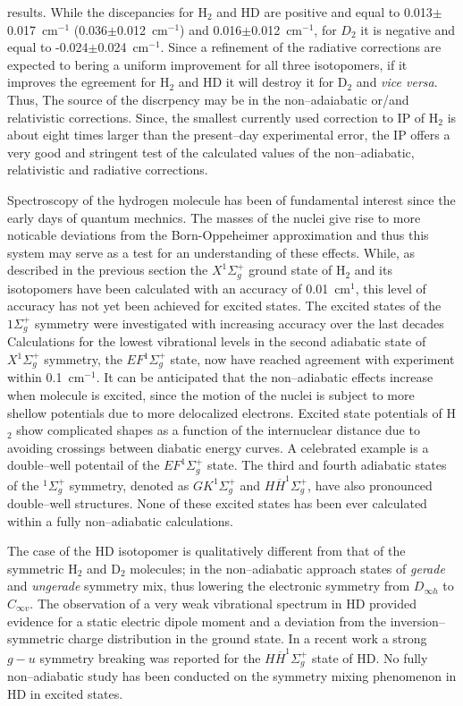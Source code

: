results. While the discepancies for H$_2$ and HD are positive
and equal to 0.013$\pm$0.017~cm$^{-1}$ (0.036$\pm$0.012~cm$^{-1}$)
and 0.016$\pm$0.012~cm$^{-1}$, for $D_2$ it is negative
and equal to -0.024$\pm$0.024~cm$^{-1}$.
Since  a refinement of the radiative corrections are expected
to bering a uniform improvement for all three isotopomers, if
it improves the egreement for H$_2$ and HD it will destroy
it for D$_2$ and {\it vice versa}. Thus, The source of the discrpency
may be in the non--adaiabatic or/and relativistic corrections.
Since, the smallest currently used correction to IP of H$_2$
is about eight times larger than the present--day experimental error,
the IP offers a very good and stringent test of the
calculated values of the non--adiabatic, relativistic and
radiative corrections.

Spectroscopy of the hydrogen molecule has been of fundamental
interest since the early days of quantum mechnics.
The masses of the nuclei give rise to more noticable
deviations from the Born-Oppeheimer approximation
and thus this system  may serve as a test for an
understanding of these effects. While, as described in the
previous section the $X^1\Sigma_g^+$ ground state of H$_2$
and its isotopomers have been calculated with an accuracy
of 0.01~cm$^1$, this level of accuracy has not yet been
achieved for excited states. The excited states of the
$1\Sigma_g^+$ symmetry were investigated with increasing
accuracy over the last decades\cite{w1,w2}
Calculations for the lowest vibrational levels in the second adiabatic state
of $X^1\Sigma_g^+$ symmetry, the $EF^1\Sigma_g^+$ state,
now have reached agreement with experiment within 0.1~cm$^{-1}$.
It can be anticipated that the non--adiabatic
effects increase when molecule is excited, since
the motion of the nuclei is subject to more shellow
potentials due to more delocalized electrons.
Excited state potentials of H$_2$ show complicated
shapes as a function of the internuclear distance  due
to avoiding crossings between diabatic energy curves.
A celebrated example is a double--well potentail of the
$EF^1\Sigma_g^+$ state. The third and fourth adiabatic states of
the $^1\Sigma_g^+$ symmetry, denoted as $GK^1\Sigma_g^+$
and $H\overline{H}^1\Sigma_g^+$,
have also  pronounced double--well structures.
None of these excited states has been ever calculated
within a fully non--adiabatic calculations.


The case of the HD isotopomer is qualitatively different
from that of the symmetric H$_2$ and D$_2$ molecules;
in the non--adiabatic approach states of {\it gerade}
and {\it ungerade} symmetry mix, thus lowering the
electronic symmetry from $D_{\infty h}$ to $C_{\infty v}$.
The observation of a very weak vibrational spectrum in HD
provided evidence for a static electric dipole moment
and a deviation from the inversion--symmetric charge
distribution in the ground state.
In a recent work\cite{w28} a strong $g-u$
symmetry breaking was reported for the $H\overline{H}^1\Sigma_g^+$
state of HD. No fully non--adiabatic study has been
conducted on the symmetry mixing phenomenon in HD in
excited states.




